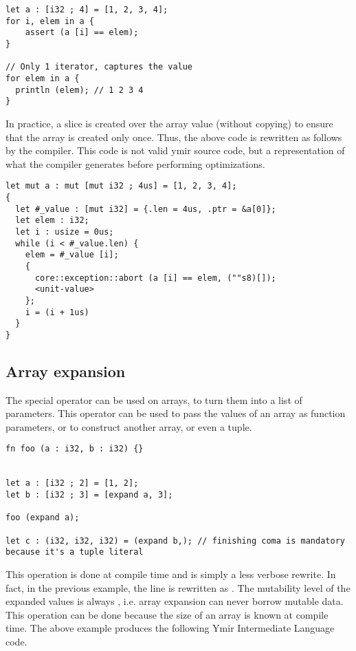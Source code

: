 \begin{lstlisting}[style=coloredverbatim]
let a : [i32 ; 4] = [1, 2, 3, 4];
for i, elem in a {
    assert (a [i] == elem);
}

// Only 1 iterator, captures the value
for elem in a {
  println (elem); // 1 2 3 4
}
\end{lstlisting}

In practice, a slice is created over the array value (without copying) to ensure
that the array is created only once. Thus, the above code is rewritten as
follows by the compiler. This code is not valid ymir source code, but a
representation of what the compiler generates before performing optimizations.

\begin{lstlisting}[style=myilVerb]
let mut a : mut [mut i32 ; 4us] = [1, 2, 3, 4];
{
  let #_value : [mut i32] = {.len = 4us, .ptr = &a[0]};
  let elem : i32;
  let i : usize = 0us;
  while (i < #_value.len) {
    elem = #_value [i];
    {
      core::exception::abort (a [i] == elem, (""s8)[]);
      <unit-value>
    };
    i = (i + 1us)
  }
}
\end{lstlisting}


\subsection {Array expansion}

The special operator  can be used on arrays, to turn them into a
list of parameters. This operator can be used to pass the values of an array as
function parameters, or to construct another array, or even a tuple.

\begin{lstlisting}[style=coloredverbatim]
fn foo (a : i32, b : i32) {}


let a : [i32 ; 2] = [1, 2];
let b : [i32 ; 3] = [expand a, 3];

foo (expand a);

let c : (i32, i32, i32) = (expand b,); // finishing coma is mandatory because it's a tuple literal
\end{lstlisting}

This operation is done at compile time and is simply a less verbose rewrite. In
fact, in the previous example, the line  is rewritten as
. The mutability level of the expanded values is
always , i.e. array expansion can never borrow mutable data. This
operation can be done because the size of an array is known at compile time. The
above example produces the following Ymir Intermediate Language code.

